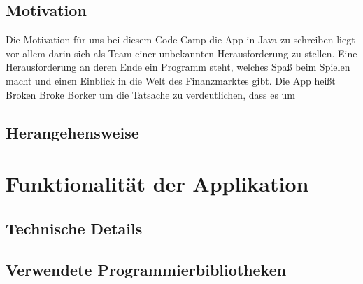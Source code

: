 \documentclass[10pt]{scrartcl}
\begin{document}
\subsection{Motivation}
Die Motivation für uns bei diesem Code Camp die App in Java zu schreiben liegt vor allem darin sich als Team einer unbekannten Herausforderung zu stellen. Eine Herausforderung an deren Ende ein Programm steht, welches Spaß beim Spielen macht und einen Einblick in die Welt des Finanzmarktes gibt. Die App heißt Broken Broke Borker um die Tatsache zu verdeutlichen, dass es um 

\subsection{Herangehensweise}

\section{Funktionalität der Applikation}


\subsection{Technische Details}

\subsection{Verwendete Programmierbibliotheken}
\end{document}

